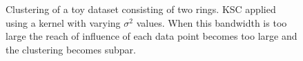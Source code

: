 \begin{figure}[h]
{\begin{minipage}{0.48\textwidth}
\end{minipage}}\\
%
\quad
{}\\
%
\caption{Clustering of a toy dataset consisting of two rings. KSC applied using a kernel with varying $\sigma^2$ values. When this bandwidth is too large the reach of influence of each data point becomes too large and the clustering becomes subpar.}
\label{spectraltoy}
\end{figure}


